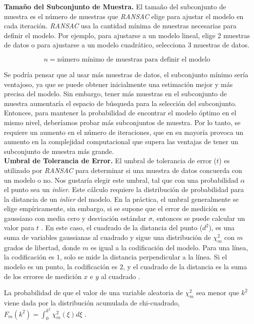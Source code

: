 \textbf{Tamaño del Subconjunto de Muestra.}
El tamaño del subconjunto de muestra es el número de muestras que \textit{RANSAC} elige para ajustar el modelo en cada iteración. \textit{RANSAC} usa la cantidad mínima de muestras necesarias para definir el modelo. Por ejemplo, para ajustarse a un modelo lineal, elige 2 muestras de datos o para ajustarse a un modelo cuadrático, selecciona 3 muestras de datos.

$$n = \text{número mínimo de muestras para definir el modelo}$$

Se podría pensar que al usar más muestras de datos, el subconjunto mínimo sería ventajoso, ya que se puede obtener inicialmente una estimación mejor y más precisa del modelo. Sin embargo, tener más muestras en el subconjunto de muestra aumentaría el espacio de búsqueda para la selección del subconjunto. Entonces, para mantener la probabilidad de encontrar el modelo óptimo en el mismo nivel, deberíamos probar más subconjuntos de muestra. Por lo tanto, se requiere un aumento en el número de iteraciones, que en su mayoría provoca un aumento en la complejidad computacional que supera las ventajas de tener un subconjunto de muestra más grande.\\

\textbf{Umbral de Tolerancia de Error.}
El umbral de tolerancia de error ($t$) es utilizado por \textit{RANSAC} para determinar si una muestra de datos concuerda con un modelo o no. Nos gustaría elegir este umbral, tal que con una probabilidad $\alpha$ el punto sea un \textit{inlier}. Este cálculo requiere la distribución de probabilidad para la distancia de un \textit{inlier} del modelo. En la práctica, el umbral generalmente se elige empíricamente, sin embargo, si se supone que el error de medición es gaussiano con media cero y desviación estándar $\sigma$, entonces se puede calcular un valor para $t$ \cite{RichardAndrew}. En este caso, el cuadrado de la distancia del punto ($d^2$), es una suma de variables gaussianas al cuadrado y sigue una distribución de $\chi_{m}^2$ con $m$ grados de libertad, donde $m$ es igual a la codificación del modelo. Para una línea, la codificación es $1$, solo se mide la distancia perpendicular a la línea. Si el modelo es un punto, la codificación es $2$, y el cuadrado de la distancia es la suma de los errores de medición $x$ e $y$ al cuadrado \cite{RichardAndrew}.

La probabilidad de que el valor de una variable aleatoria de $\chi_{m}^2$ sea menor que $k^2$ viene dada por la distribución acumulada de chi-cuadrado, $F_m(k^2) = \int_{0}^{k^2} \chi_{m}^2(\xi)d\xi$ \cite{RichardAndrew}.

